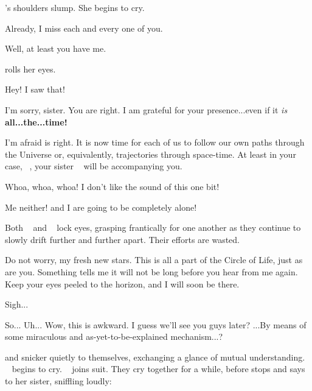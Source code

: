 \documentclass[main.tex]{subfiles}
\begin{document}
\par \nar \rmalcyone's shoulders slump.  She begins to cry.

\par \Alcyone Already, I miss each and every one of you.

\par \Taygete Well, at least you have me.

\par \nar \rmalcyone rolls her eyes.

\par \Taygete Hey!  I saw that!

\par \Alcyone I'm sorry, sister.  You are right.  I am grateful for your presence...even if it \textit{is} \textbf{all...the...time!}

\par \Maia I'm afraid \rmalcyone is right.  It is now time for each of us to follow our own paths through the Universe or, equivalently, trajectories through space-time.  At least in your case, \rmtaygete~, your sister \rmalcyone~ will be accompanying you.

\par \Electra Whoa, whoa, whoa!  I don't like the sound of this one bit!

\par \Sterope Me neither! \rmelectra and I are going to be completely alone!

\par \nar Both \rmsterope~ and \rmelectra~ lock eyes, grasping frantically for one another as they continue to slowly drift further and further apart. Their efforts are wasted.

\par \Maia Do not worry, my fresh new stars. This is all a part of the Circle of Life, just as are you.  Something tells me it will not be long before you hear from me again. Keep your eyes peeled to the horizon, and I will soon be there.  

\par \Electra Sigh...  

\par \Taygete So... Uh... Wow, this is awkward.  I guess we'll see you guys later?  ...By means of some miraculous and as-yet-to-be-explained mechanism...?
  
\par \nar \rmtaygete and \rmalcyone snicker quietly to themselves, exchanging a glance of mutual understanding. \rmelectra~ begins to cry.  \rmsterope~ joins suit.  They cry together for a while, before \rmsterope stops and says to her sister, sniffling loudly:
\end{document}
